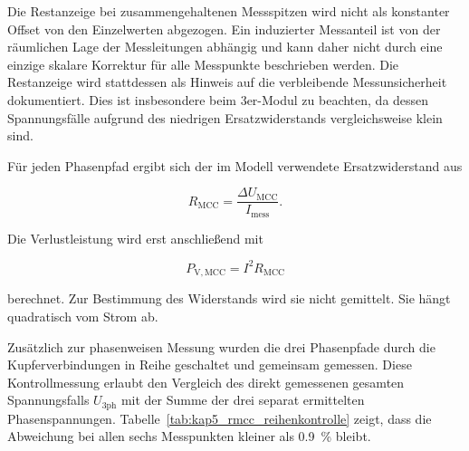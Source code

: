 
Die Restanzeige bei zusammengehaltenen Messspitzen wird nicht als konstanter
Offset von den Einzelwerten abgezogen. Ein induzierter Messanteil ist von der
räumlichen Lage der Messleitungen abhängig und kann daher nicht durch eine
einzige skalare Korrektur für alle Messpunkte beschrieben werden. Die
Restanzeige wird stattdessen als Hinweis auf die verbleibende
Messunsicherheit dokumentiert. Dies ist insbesondere beim 3er-Modul zu
beachten, da dessen Spannungsfälle aufgrund des niedrigen Ersatzwiderstands
vergleichsweise klein sind.

Für jeden Phasenpfad ergibt sich der im Modell verwendete Ersatzwiderstand aus

\begin{equation}
    R_\mathrm{MCC}
    =
    \frac{\Delta U_\mathrm{MCC}}{I_\mathrm{mess}}.
    \label{eq:kap5_rmcc_bestimmung}
\end{equation}

Die Verlustleistung wird erst anschließend mit

\begin{equation}
    P_\mathrm{V,MCC}
    =
    I^2R_\mathrm{MCC}
    \label{eq:kap5_rmcc_verlustleistung}
\end{equation}

berechnet. Zur Bestimmung des Widerstands wird sie nicht gemittelt. Sie hängt
quadratisch vom Strom ab.

Zusätzlich zur phasenweisen Messung wurden die drei Phasenpfade durch die
Kupferverbindungen in Reihe geschaltet und gemeinsam gemessen. Diese
Kontrollmessung erlaubt den Vergleich des direkt gemessenen gesamten
Spannungsfalls \(U_\mathrm{3ph}\) mit der Summe der drei separat ermittelten
Phasenspannungen. Tabelle~\ref{tab:kap5_rmcc_reihenkontrolle} zeigt, dass
die Abweichung bei allen sechs Messpunkten kleiner als
\SI{0.9}{\percent} bleibt.

